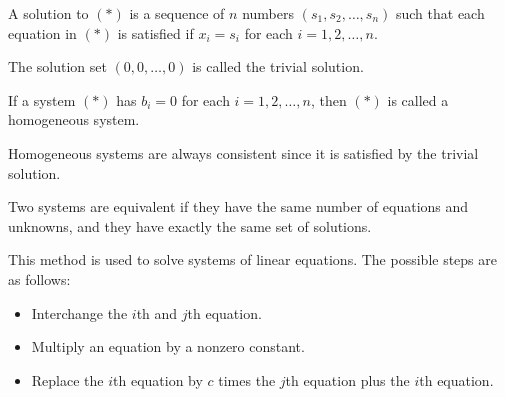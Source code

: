     \begin{dfn}[Solution]
        A solution to \((*)\) is a sequence of \(n\) numbers \((s_1, s_2, \ldots, s_n)\) such that each equation in \((*)\) is satisfied if \(x_i = s_i\) for each \(i = 1, 2, \ldots, n\).
    \end{dfn}

    \begin{dfn}
        The solution set \((0, 0, \ldots, 0)\) is called the trivial solution.
    \end{dfn}

    \begin{dfn}
        If a system \((*)\) has \(b_i = 0\) for each \(i = 1, 2, \ldots, n\), then \((*)\) is called a homogeneous system.
    \end{dfn}

    \begin{note}
        Homogeneous systems are always consistent since it is satisfied by the trivial solution.
    \end{note}

    \begin{dfn}
        Two systems are equivalent if they have the same number of equations and unknowns, and they have exactly the same set of solutions.
    \end{dfn}

    \begin{dfn}
        This method is used to solve systems of linear equations. The possible steps are as follows:
        \begin{itemize}
            \item Interchange the \(i\)th and \(j\)th equation.
            \item Multiply an equation by a nonzero constant.
            \item Replace the \(i\)th equation by \(c\) times the \(j\)th equation plus the \(i\)th equation.
        \end{itemize}
    \end{dfn}

